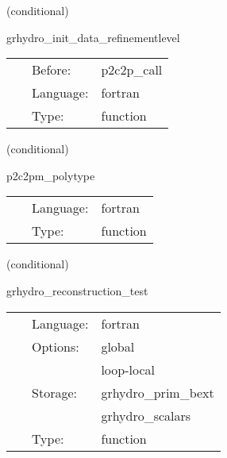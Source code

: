 \documentclass{article}
\begin{document}
   (conditional) 

\hspace{5mm} grhydro\_init\_data\_refinementlevel 

\hspace{5mm}{\it calculate current refinement level } 


\hspace{5mm}

 \begin{tabular*}{160mm}{cll} 
~ & Before:  & p2c2p\_call \\ 
~ & Language:  & fortran \\ 
~ & Type:  & function \\ 
\end{tabular*} 


\vspace{5mm}

   (conditional) 

\hspace{5mm} p2c2pm\_polytype 

\hspace{5mm}{\it testing primitive to conservative to primitive - mhd polytype version } 


\hspace{5mm}

 \begin{tabular*}{160mm}{cll} 
~ & Language:  & fortran \\ 
~ & Type:  & function \\ 
\end{tabular*} 


\vspace{5mm}

   (conditional) 

\hspace{5mm} grhydro\_reconstruction\_test 

\hspace{5mm}{\it testing the reconstruction } 


\hspace{5mm}

 \begin{tabular*}{160mm}{cll} 
~ & Language:  & fortran \\ 
~ & Options:  & global \\ 
~& ~ &loop-local\\ 
~ & Storage:  & grhydro\_prim\_bext \\ 
~& ~ &grhydro\_scalars\\ 
~ & Type:  & function \\ 
\end{tabular*} 
\end{document}
